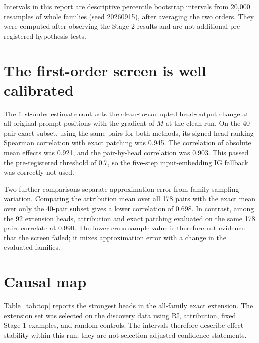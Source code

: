 \documentclass[11pt,a4paper]{article}
\begin{document}
Intervals in this report are descriptive percentile bootstrap intervals from
20,000 resamples of whole families (seed 20260915), after averaging the two
orders. They were computed after observing the Stage-2 results and are not
additional pre-registered hypothesis tests.

\section{The first-order screen is well calibrated}
The first-order estimate contracts the clean-to-corrupted head-output change at
all original prompt positions with the gradient of $M$ at the clean run. On the
40-pair exact subset, using the same pairs for both methods, its signed
head-ranking Spearman correlation with exact patching was 0.945. The correlation
of absolute mean effects was 0.921, and the pair-by-head correlation was 0.903.
This passed the pre-registered threshold of 0.7, so the five-step
input-embedding IG fallback was correctly not used.

Two further comparisons separate approximation error from family-sampling
variation. Comparing the attribution mean over all 178 pairs with the exact mean
over only the 40-pair subset gives a lower correlation of 0.698. In contrast,
among the 92 extension heads, attribution and exact patching evaluated on the
same 178 pairs correlate at 0.990. The lower cross-sample value is therefore not
evidence that the screen failed; it mixes approximation error with a change in
the evaluated families.

\section{Causal map}
Table~\ref{tab:top} reports the strongest heads in the all-family exact
extension. The extension set was selected on the discovery data using RI,
attribution, fixed Stage-1 examples, and random controls. The intervals therefore
describe effect stability within this run; they are not selection-adjusted
confidence statements.
\end{document}
